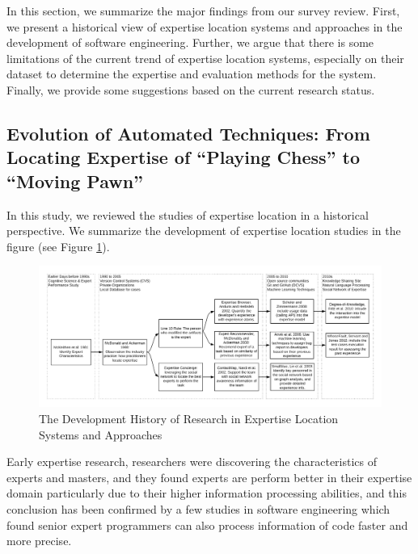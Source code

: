 In this section, we summarize the major findings from our survey review. First, we present a historical view of expertise location systems and approaches in the development of software engineering. Further, we argue that there is some limitations of the current trend of expertise location systems, especially on their dataset to determine the expertise and evaluation methods for the system. Finally, we provide some suggestions based on the current research status.

\subsection{Evolution of Automated Techniques: From Locating Expertise of ``Playing Chess'' to ``Moving Pawn''}

In this study, we reviewed the studies of expertise location in a historical perspective. We summarize the development of expertise location studies in the figure (see Figure \ref{history}).

\begin{figure}
    \includegraphics[width=\textwidth]{History.png}
    \caption{The Development History of Research in Expertise Location Systems and Approaches}
    \label{history}
\end{figure}

Early expertise research, researchers were discovering the characteristics of experts and masters, and they found experts are perform better in their expertise domain particularly due to their higher information processing abilities, and this conclusion has been confirmed by a few studies in software engineering which found senior expert programmers can also process information of code faster and more precise.

